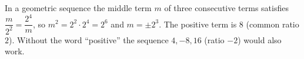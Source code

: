 In a geometric sequence the middle term $m$ of three consecutive terms satisfies $\dfrac{m}{2^2}=\dfrac{2^4}{m}$, so $m^2=2^2\cdot2^4=2^6$ and $m=\pm2^3$. The positive term is $\boxed{8}$ (common ratio $2$). Without the word ``positive'' the sequence $4,-8,16$ (ratio $-2$) would also work.
